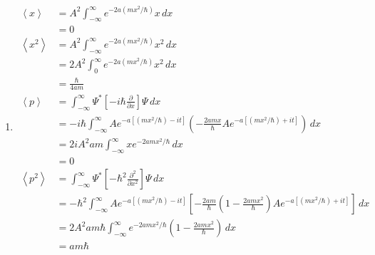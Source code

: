 \documentclass{article}
\newcommand{\ev}[1]{\left< #1 \right>}
\begin{document}
\begin{enumerate}
  \item

        \begin{align*}
          \ev{x}   & = A^2 \int_{-\infty}^\infty e^{-2 a (m x^2 / \hbar)} x \,d x                                                                                                                            \\
                   & = 0                                                                                                                                                                                     \\
          \ev{x^2} & = A^2 \int_{-\infty}^\infty e^{-2 a (m x^2 / \hbar)} x^2 \,d x                                                                                                                          \\
                   & = 2 A^2 \int_0^\infty e^{-2 a (m x^2 / \hbar)} x^2 \,d x                                                                                                                                \\
                   & = \frac{\hbar}{4 a m}                                                                                                                                                                   \\
          \ev{p}   & = \int_{-\infty}^\infty \Psi^* \left[ -i \hbar \frac{\partial}{\partial x} \right] \Psi \,d x                                                                                           \\
                   & = -i \hbar \int_{-\infty}^\infty A e^{-a [(m x^2 / \hbar) - i t]} \left( -\frac{2 a m x}{\hbar} A e^{-a [(m x^2 / \hbar) + i t]} \right) \,d x                                          \\
                   & = 2 i A^2 a m \int_{-\infty}^\infty x e^{-2 a m x^2 / \hbar} \,d x                                                                                                                      \\
                   & = 0                                                                                                                                                                                     \\
          \ev{p^2} & = \int_{-\infty}^\infty \Psi^* \left[ -\hbar^2 \frac{\partial^2}{\partial x^2} \right] \Psi \,d x                                                                                       \\
                   & = -\hbar^2 \int_{-\infty}^\infty A e^{-a [(m x^2 / \hbar) - i t]} \left[ -\frac{2 a m}{\hbar} \left( 1 - \frac{2 a m x^2}{\hbar} \right) A e^{-a [(m x^2 / \hbar) + i t]} \right] \,d x \\
                   & = 2 A^2 a m \hbar \int_{-\infty}^\infty e^{-2 a m x^2 / \hbar} \left( 1 - \frac{2 a m x^2}{\hbar} \right) \,d x                                                                         \\
                   & = a m \hbar
        \end{align*}


\end{enumerate}
\end{document}
